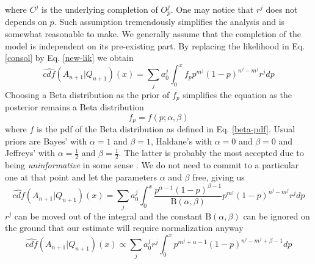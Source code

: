 \documentclass[runningheads]{llncs}
\begin{document}
where $C^j$ is the underlying completion of $O^j_p$. One may notice
that $r^j$ does not depends on $p$. Such assumption tremendously
simplifies the analysis and is somewhat reasonable to make. We
generally assume that the completion of the model is independent on
its pre-existing part.
By replacing the likelihood in Eq. \ref{consol} by Eq. \ref{new-lik}
we obtain
\begin{equation}
  \label{betaconsol}
  \hat{cdf}(A_{n+1}|Q_{n+1})(x) = \sum_j a_0^j \int_0^x f_p p^{m^j}(1-p)^{n^j-m^j}
  r^j dp
\end{equation}
Choosing a Beta distribution as the prior of $f_p$ simplifies the
equation as the posterior remains a Beta distribution
\begin{equation}
f_p = f(p; \alpha, \beta)
\end{equation}
where $f$ is the pdf of the Beta distribution as defined in
Eq. \ref{beta-pdf}. Usual priors are Bayes' with $\alpha = 1$ and
$\beta = 1$, Haldane's with $\alpha = 0$ and $\beta = 0$ and Jeffreys'
with $\alpha = \frac{1}{2}$ and $\beta = \frac{1}{2}$. The latter is
probably the most accepted due to being \emph{uninformative} in some
sense \cite{Jeffreys46Invariant}. We do not need to commit to a
particular one at that point and let the parameters $\alpha$ and
$\beta$ free, giving us
\begin{equation}
  \label{betaconsol-1}
  \hat{cdf}(A_{n+1}|Q_{n+1})(x) = \sum_j a_0^j \int_0^x
  \frac{p^{\alpha - 1}(1-p)^{\beta - 1}}{\mathrm{B}(\alpha, \beta)}
  p^{m^j}(1-p)^{n^j-m^j} r^j dp
\end{equation}
$r^j$ can be moved out of the integral and the constant
$\mathrm{B}(\alpha, \beta)$ can be ignored on the ground that our
estimate will require normalization anyway
\begin{equation}
  \label{betaconsol-2}
  \hat{cdf}(A_{n+1}|Q_{n+1})(x) \propto \sum_j a_0^j r^j
  \int_0^x p^{m^j+\alpha - 1}(1-p)^{n^j-m^j+\beta - 1} dp
\end{equation}
\end{document}
